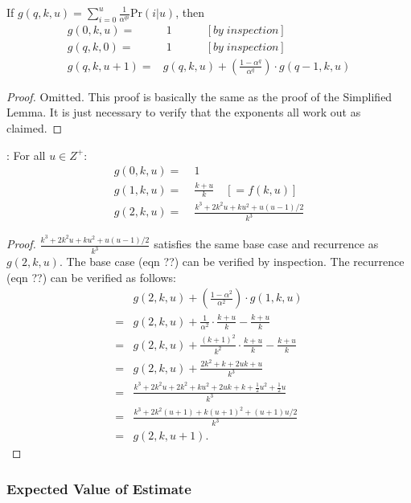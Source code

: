 \documentclass{sig-alternate}
\begin{document}
 If $g(q,k,u) = \sum_{i=0}^u \frac{1}{\alpha^{qi}} \mathrm{Pr}(i|u)$, then
\begin{align}
g(0,k,u) = & \;1 \quad \quad \quad [by\;inspection] \\
g(q,k,0) = & \;1 \quad \quad \quad [by\;inspection] \\
g(q,k,u\!+\!1) = & g(q,k,u) + \left(\frac{1-\alpha^q}{\alpha^q}\right) \cdot g(q\!-\!1,k,u)
\end{align}
\begin{proof}
Omitted. This proof is basically the same as the proof of the Simplified Lemma. It is just necessary to verify that the
exponents all work out as claimed.
\end{proof}

: For all $u \in Z^+$:
\begin{align}
g(0,k,u) = & \;1 \\
g(1,k,u) = & \;\frac{k+u}{k} \quad [= f(k,u)] \\
g(2,k,u) = & \;\frac{k^3 + 2 k^2 u + ku^2 + u(u\!-\!1)/2}{k^3}
\end{align}
\begin{proof}
$\frac{k^3 + 2 k^2 u + ku^2 + u(u\!-\!1)/2}{k^3}$ satisfies the same base case and recurrence as $g(2,k,u)$.
The base case (eqn ??) can be verified by inspection. The recurrence (eqn ??) can be verified as follows:
\begin{align}
   & g(2,k,u) + \left(\frac{1-\alpha^2}{\alpha^2}\right) \cdot g(1,k,u) \\
 = & g(2,k,u) + \frac{1}{\alpha^2} \cdot \frac{k+u}{k} - \frac{k+u}{k} \\
 = & g(2,k,u) + \frac{(k+1)^2}{k^2} \cdot \frac{k+u}{k} - \frac{k+u}{k} \\
 = & g(2,k,u) + \frac{2k^2+k+2uk+u}{k^3} \\
 = & \frac{k^3 + 2k^2u +2k^2 + ku^2 + 2uk + k + \frac{1}{2} u^2 + \frac{1}{2} u}{k^3} \\
 = & \frac{k^3 + 2k^2(u+1) + k(u+1)^2 + (u+1)u/2}{k^3} \\
 = & g(2,k,u+1).
\end{align}
\end{proof}

\subsubsection{Expected Value of Estimate}
\end{document}
